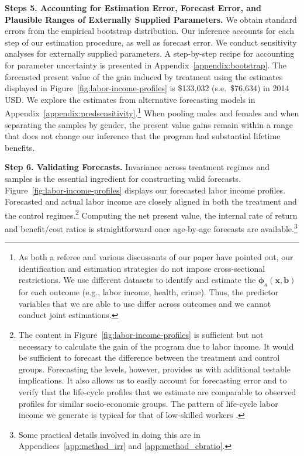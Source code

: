 \textbf{Steps 5. Accounting for Estimation Error, Forecast Error, and Plausible Ranges of Externally Supplied Parameters.} We obtain standard errors from the empirical bootstrap distribution. Our inference accounts for each step of our estimation procedure, as well as forecast error. We conduct sensitivity analyses for externally supplied parameters. A step-by-step recipe for accounting for parameter uncertainty is presented in Appendix~\ref{appendix:bootstrap}. The forecasted present value of the gain induced by treatment using the estimates displayed in Figure~\ref{fig:labor-income-profiles} is \$133,032 (s.e.\ \$76,634) in 2014 USD. We explore the estimates from alternative forecasting models in Appendix~\ref{appendix:predsensitivity}.\footnote{As both a referee and various discussants of our paper have pointed out, our identification and estimation strategies do not impose cross-sectional restrictions. We use different datasets to identify and estimate the  $\bm{\phi}_{a} \left( \bm{x}, \bm{b} \right)$ for each outcome (e.g., labor income, health, crime). Thus, the predictor variables that we are able to use differ across outcomes and we cannot conduct joint estimations.} When pooling males and females and when separating the samples by gender, the present value gains remain within a range that does not change our inference that the program had substantial lifetime benefits.

\textbf{Step 6. Validating Forecasts.} Invariance across treatment regimes and samples is the essential ingredient for constructing valid forecasts. Figure~\ref{fig:labor-income-profiles} displays our forecasted labor income profiles. Forecasted and actual labor income are closely aligned in both the treatment and the control regimes.\footnote{The content in Figure~\ref{fig:labor-income-profiles} is sufficient but not necessary to calculate the gain of the program due to labor income. It would be sufficient to forecast the difference between the treatment and control groups. Forecasting the levels, however, provides us with additional testable implications. It also allows us to easily account for forecasting error and to verify that the life-cycle profiles that we estimate are comparable to observed profiles for similar socio-economic groups. The pattern of life-cycle labor income we generate is typical for that of low-skilled workers \citep{Blundell-etal_2015_J-Pub-E,Gladden_Taber_2000_WageProgression,Sanders-Taber_2012_AR,Lagakos_Moll_etal_2016_LifeCycle_NBER}.} Computing the net present value, the internal rate of return and benefit/cost ratios is straightforward once age-by-age forecasts are available.\footnote{Some practical details involved in doing this are in Appendices~\ref{app:method_irr} and \ref{app:method_cbratio}.}

